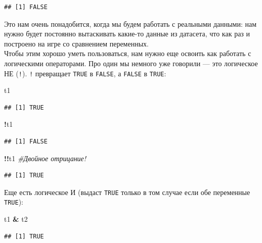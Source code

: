 \documentclass[]{book}
\newenvironment{Shaded}{\begin{snugshade}}{\end{snugshade}}
\newcommand{\StringTok}[1]{\textcolor[rgb]{0.31,0.60,0.02}{#1}}
\newcommand{\CommentTok}[1]{\textcolor[rgb]{0.56,0.35,0.01}{\textit{#1}}}
\newcommand{\OperatorTok}[1]{\textcolor[rgb]{0.81,0.36,0.00}{\textbf{#1}}}
\newcommand{\NormalTok}[1]{#1}
\begin{document}
\begin{verbatim}
## [1] FALSE
\end{verbatim}

Это нам очень понадобится, когда мы будем работать с реальными данными:
нам нужно будет постоянно вытаскивать какие-то данные из датасета, что
как раз и построено на игре со сравнением переменных.\\
Чтобы этим хорошо уметь пользоваться, нам нужно еще освоить как работать
с логическими операторами. Про один мы немного уже говорили --- это
логическое НЕ (\texttt{!}). \texttt{!} превращает \texttt{TRUE} в
\texttt{FALSE}, а \texttt{FALSE} в \texttt{TRUE}:

\begin{Shaded}
\begin{Highlighting}[]
\NormalTok{t1}
\end{Highlighting}
\end{Shaded}

\begin{verbatim}
## [1] TRUE
\end{verbatim}

\begin{Shaded}
\begin{Highlighting}[]
\OperatorTok{!}\NormalTok{t1}
\end{Highlighting}
\end{Shaded}

\begin{verbatim}
## [1] FALSE
\end{verbatim}

\begin{Shaded}
\begin{Highlighting}[]
\OperatorTok{!!}\NormalTok{t1 }\CommentTok{#Двойное отрицание!}
\end{Highlighting}
\end{Shaded}

\begin{verbatim}
## [1] TRUE
\end{verbatim}

Еще есть логическое И (выдаст \texttt{TRUE} только в том случае если обе
переменные \texttt{TRUE}):

\begin{Shaded}
\begin{Highlighting}[]
\NormalTok{t1 }\OperatorTok{&}\StringTok{ }\NormalTok{t2}
\end{Highlighting}
\end{Shaded}

\begin{verbatim}
## [1] TRUE
\end{verbatim}
\end{document}

